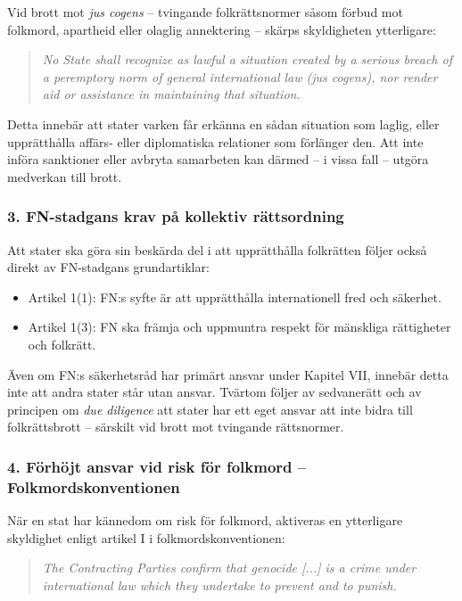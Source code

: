 Vid brott mot \textit{jus cogens} – tvingande folkrättsnormer såsom förbud mot folkmord, 
apartheid eller olaglig annektering – skärps skyldigheten ytterligare:

\begin{quote}
\textit{No State shall recognize as lawful a situation created by a serious breach of a peremptory norm of general international law (jus cogens), nor render aid or assistance in maintaining that situation.}
\end{quote}

Detta innebär att stater varken får erkänna en sådan situation som laglig, eller 
upprätthålla affärs- eller diplomatiska relationer som förlänger den. 
Att inte införa sanktioner eller avbryta samarbeten kan därmed – i vissa fall – utgöra medverkan till brott.

\subsubsection*{ 3. FN-stadgans krav på kollektiv rättsordning}

Att stater ska göra sin beskärda del i att upprätthålla folkrätten följer också direkt av FN-stadgans grundartiklar:

\begin{itemize}
  \item Artikel 1(1): FN:s syfte är att upprätthålla internationell fred och säkerhet.
  \item Artikel 1(3): FN ska främja och uppmuntra respekt för mänskliga rättigheter och folkrätt.
\end{itemize}

Även om FN:s säkerhetsråd har primärt ansvar under Kapitel VII, innebär detta inte att 
andra stater står utan ansvar. Tvärtom följer av sedvanerätt och av principen 
om \textit{due diligence} att stater har ett eget ansvar att inte bidra till 
folkrättsbrott – särskilt vid brott mot tvingande rättsnormer.%

\subsubsection*{ 4. Förhöjt ansvar vid risk för folkmord – Folkmordskonventionen}

När en stat har kännedom om risk för folkmord, aktiveras en ytterligare skyldighet enligt 
artikel I i folkmordskonventionen:

\begin{quote}
\textit{The Contracting Parties confirm that genocide [...] is a crime under international law which they undertake to prevent and to punish.}
\end{quote}

